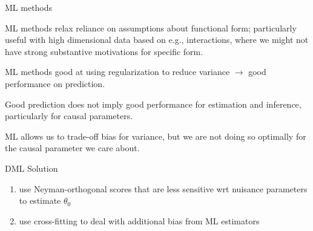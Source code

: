 \documentclass[xcolor={table}]{beamer}
\begin{document}
\note{
\scriptsize \singlespacing

}
\begin{frame}{ML methods}

\begin{wideitemize}
\item ML methods relax reliance on assumptions about functional form; \pause particularly useful with high dimensional data based on e.g., interactions, where we might not have strong substantive motivations for specific form. \pause
\item ML methods good at using regularization to reduce variance \pause $\rightarrow$ good performance on prediction. \pause
\item Good prediction does not imply good performance for estimation and inference, particularly for causal parameters.\pause
\item ML allows us to trade-off bias for variance, but we are not doing so optimally for the causal parameter we care about. 
\end{wideitemize}

\end{frame}


\note{
\scriptsize \singlespacing

}
\begin{frame}{DML Solution}

\begin{enumerate}
\item use Neyman-orthogonal scores that are less sensitive wrt nuisance parameters to estimate $\theta_0$\pause
\item use cross-fitting to deal with additional bias from ML estimators
\end{enumerate}

\end{frame}
\end{document}
